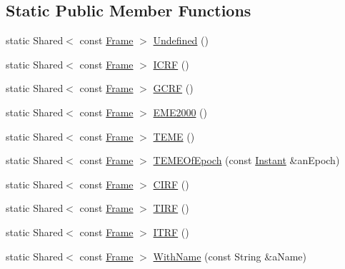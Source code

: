 \subsection*{Static Public Member Functions}
\begin{DoxyCompactItemize}
\item 
static Shared$<$ const \hyperlink{classostk_1_1physics_1_1coord_1_1_frame}{Frame} $>$ \hyperlink{classostk_1_1physics_1_1coord_1_1_frame_a292d32b849648a8e530d35ac47b5c699}{Undefined} ()
\item 
static Shared$<$ const \hyperlink{classostk_1_1physics_1_1coord_1_1_frame}{Frame} $>$ \hyperlink{classostk_1_1physics_1_1coord_1_1_frame_af111d96da6adf5405a354a769618b5f4}{I\+C\+RF} ()
\item 
static Shared$<$ const \hyperlink{classostk_1_1physics_1_1coord_1_1_frame}{Frame} $>$ \hyperlink{classostk_1_1physics_1_1coord_1_1_frame_abe31c60e3e7f654b101876cb6b9b5238}{G\+C\+RF} ()
\item 
static Shared$<$ const \hyperlink{classostk_1_1physics_1_1coord_1_1_frame}{Frame} $>$ \hyperlink{classostk_1_1physics_1_1coord_1_1_frame_a61b7c68b761966956251d393bf57f5e5}{E\+M\+E2000} ()
\item 
static Shared$<$ const \hyperlink{classostk_1_1physics_1_1coord_1_1_frame}{Frame} $>$ \hyperlink{classostk_1_1physics_1_1coord_1_1_frame_a1441cef9cd2abe312753f3a81606adfb}{T\+E\+ME} ()
\item 
static Shared$<$ const \hyperlink{classostk_1_1physics_1_1coord_1_1_frame}{Frame} $>$ \hyperlink{classostk_1_1physics_1_1coord_1_1_frame_ab47046bc517b04537c96844d95c13fdd}{T\+E\+M\+E\+Of\+Epoch} (const \hyperlink{classostk_1_1physics_1_1time_1_1_instant}{Instant} \&an\+Epoch)
\item 
static Shared$<$ const \hyperlink{classostk_1_1physics_1_1coord_1_1_frame}{Frame} $>$ \hyperlink{classostk_1_1physics_1_1coord_1_1_frame_ae858400dfa432f12b71712b52b3f5108}{C\+I\+RF} ()
\item 
static Shared$<$ const \hyperlink{classostk_1_1physics_1_1coord_1_1_frame}{Frame} $>$ \hyperlink{classostk_1_1physics_1_1coord_1_1_frame_ac159b1d21bc5f55e7163d27f4cc25c34}{T\+I\+RF} ()
\item 
static Shared$<$ const \hyperlink{classostk_1_1physics_1_1coord_1_1_frame}{Frame} $>$ \hyperlink{classostk_1_1physics_1_1coord_1_1_frame_ac1d0d50dc15982fbef3caba62a9ed507}{I\+T\+RF} ()
\item 
static Shared$<$ const \hyperlink{classostk_1_1physics_1_1coord_1_1_frame}{Frame} $>$ \hyperlink{classostk_1_1physics_1_1coord_1_1_frame_ad9f12f000a68daaec4969ba739f43ee7}{With\+Name} (const String \&a\+Name)

\end{DoxyCompactItemize}
